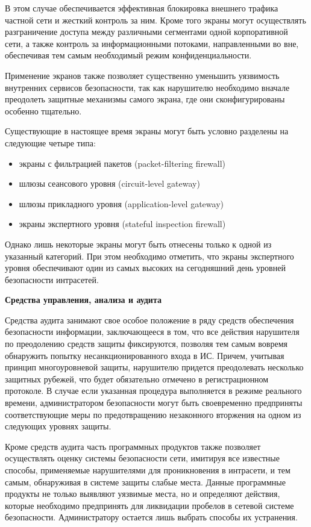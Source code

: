 В этом случае обеспечивается эффективная блокировка внешнего трафика частной сети и жесткий контроль за ним.
Кроме того экраны могут осуществлять разграничение доступа между различными сегментами одной корпоративной сети,
а также контроль за информационными потоками, направленными во вне, обеспечивая тем самым необходимый
режим конфиденциальности.

Применение экранов также позволяет существенно уменьшить уязвимость внутренних сервисов безопасности, так
как нарушителю необходимо вначале преодолеть защитные механизмы самого экрана,
где они сконфигурированы особенно тщательно.

Существующие в настоящее время экраны могут быть условно разделены на следующие четыре типа:
\begin{itemize}
    \item экраны с фильтрацией пакетов (packet-filtering firewall)
    \item шлюзы сеансового уровня (circuit-level gateway)
    \item шлюзы прикладного уровня (application-level gateway)
    \item экраны экспертного уровня (stateful inspection firewall)
\end{itemize}

Однако лишь некоторые экраны могут быть отнесены только к одной из указанный категорий.
При этом необходимо отметить, что экраны экспертного уровня обеспечивают один из самых высоких на сегодняшний
день уровней безопасности интрасетей.

\bigbreak
\textbf{Средства управления, анализа и аудита}

Средства аудита занимают свое особое положение в ряду средств обеспечения безопасности информации,
заключающееся в том, что все действия нарушителя по преодолению средств защиты фиксируются, позволяя тем самым
вовремя обнаружить попытку несанкционированного входа в ИС. Причем, учитывая принцип многоуровневой защиты,
нарушителю придется преодолевать несколько защитных рубежей, что будет обязательно отмечено в регистрационном
протоколе. В случае если указанная процедура выполняется в режиме реального времени, администратором безопасности
могут быть своевременно предприняты соответствующие меры по предотвращению незаконного вторжения на одном из
следующих уровнях защиты.

Кроме средств аудита часть программных продуктов также позволяет осуществлять оценку системы безопасности сети,
имитируя все известные способы, применяемые нарушителями для проникновения в интрасети, и тем самым, обнаруживая
в системе защиты слабые места. Данные программные продукты не только выявляют уязвимые места, но и определяют
действия, которые необходимо предпринять для ликвидации пробелов в сетевой системе безопасности. Администратору
остается лишь выбрать способы их устранения.

